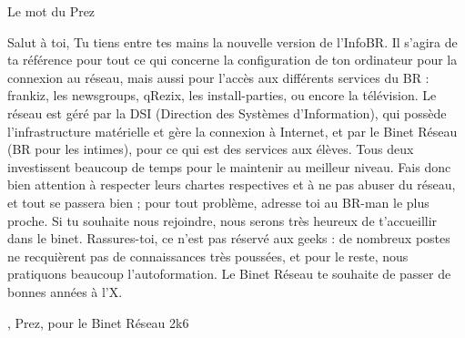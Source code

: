 

\begin{center}
    { \Huge Le mot du Prez }
\end{center}

Salut \`a toi,
\newline
\newline
Tu tiens entre tes mains la nouvelle version de l'InfoBR. Il s'agira de ta r\'ef\'erence pour tout ce qui concerne la configuration de ton ordinateur pour la connexion au r\'eseau, mais aussi pour l'acc\`es aux diff\'erents services du BR :
frankiz, les newsgroups, qRezix, les install-parties, ou encore la t\'el\'evision.
\newline
\newline
Le r\'eseau est g\'er\'e par la DSI (Direction des Syst\`emes d'Information), qui poss\`ede l'infrastructure mat\'erielle et g\`ere la connexion \`a Internet,
et par le Binet R\'eseau (BR pour les intimes), pour ce qui est des services aux \'el\`eves. Tous deux investissent beaucoup de temps pour le maintenir au meilleur niveau.
Fais donc bien attention \`a respecter leurs chartes respectives et \`a ne pas abuser du r\'eseau, et tout se passera bien ; pour tout probl\`eme, adresse toi au
BR-man le plus proche.
\newline
\newline
Si tu souhaite nous rejoindre, nous serons tr\`es heureux de t'accueillir dans le binet. Rassures-toi, ce n'est pas r\'eserv\'e aux geeks : de nombreux postes ne recqui\`erent pas de connaissances tr\`es pouss\'ees, et pour le reste, nous pratiquons beaucoup l'autoformation.
\newline
\newline
Le Binet R\'eseau te souhaite de passer de bonnes ann\'ees \`a l'X.
\newline

\begin{flushright}
    , Prez, pour le Binet R\'eseau 2k6
\end{flushright}
